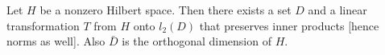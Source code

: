 Let $H$ be a nonzero Hilbert space. Then there exists a set $D$ and a linear transformation $T$ from $H$ onto $l_2(D)$ that preserves inner products [hence norms as well]. Also $\bar{D}$ is the orthogonal dimension of $H$.
